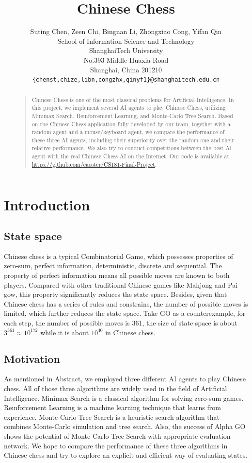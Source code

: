 \documentclass[letterpaper]{article}
\title{Chinese Chess}
\author{Suting Chen, Zeen Chi, Bingnan Li, Zhongxiao Cong, Yifan Qin\\
School of Information Science and Technology\\
ShanghaiTech University\\
No.393 Middle Huaxia Road\\
Shanghai, China 201210\\
\texttt{\{chenst,chize,libn,congzhx,qinyf1\}@shanghaitech.edu.cn}
}
\begin{document}
\maketitle

\begin{abstract}
\begin{quote}
Chinese Chess is one of the most classical problems for Artificial Intelligence.
In this project, we implement several AI agents to play Chinese Chess, utilizing Minimax Search, Reinforcement Learning, and Monte-Carlo Tree Search.
Based on the Chinese Chess application fully developed by our team, together with a random agent and a mouse/keyboard agent, we compare the performance of these three AI agents, including their superiority over the random one and their relative performance.
We also try to conduct competitions between the best AI agent with the real Chinese Chess AI on the Internet.
Our code is available at \url{https://github.com/caoster/CS181-Final-Project}.
\end{quote}
\end{abstract}


    \section{Introduction}\label{sec:introduction}

    \subsection{State space}\label{subsec:state-space}
    Chinese chess is a typical Combinatorial Game, which possesses properties of zero-sum, perfect information, deterministic, discrete and sequential.
    The property of perfect information means all possible moves are known to both players.
    Compared with other traditional Chinese games like Mahjong and Pai gow, this property significantly reduces the state space.
    Besides, given that Chinese chess has a series of rules and constrains, the number of possible moves is limited, which further reduces the state space.
    Take GO as a counterexample, for each step, the number of possible moves is 361, the size of state space is about $3^{361}\approx 10^{172}$ while it is about $10^{40}$ in Chinese chess.

    \subsection{Motivation}\label{subsec:motivation}
    As mentioned in Abstract, we employed three different AI agents to play Chinese chess.
    All of those three algorithms are widely used in the field of Artificial Intelligence.
    Minimax Search is a classical algorithm for solving zero-sum games.
    Reinforcement Learning is a machine learning technique that learns from experience.
    Monte-Carlo Tree Search is a heuristic search algorithm that combines Monte-Carlo simulation and tree search.
    Also, the success of Alpha GO shows the potential of Monte-Carlo Tree Search with appropriate evaluation network.
    We hope to compare the performance of these three algorithms in Chinese chess and try to explore an explicit and efficient way of evaluating states.
\end{document}
